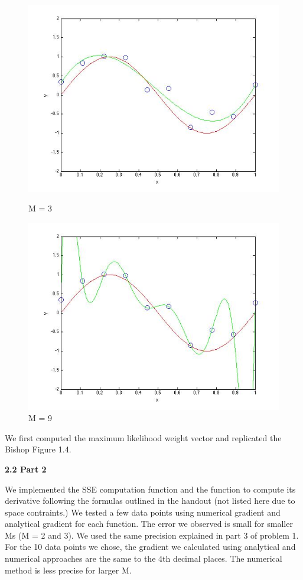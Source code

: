 \begin{figure}[!htb]
  \includegraphics[width=\linewidth]{figures/p2_MLE_M=3}
  \caption{M = 3}\label{fig:figures/p2_M=3}
\endminipage\hfill
{}                                                                            
  \includegraphics[width=\linewidth]{figures/p2_MLE_M=9}
  \caption{M = 9}\label{fig:figures/p2_M=9}
\endminipage\hfill
\end{figure}

We first computed the maximum likelihood weight vector and replicated 
the Bishop Figure 1.4.


{\bfseries 2.2 Part 2}

We implemented the SSE computation function and the function to compute its derivative following the formulas outlined in the handout (not listed here due to space contraints.)
We tested a few data points using numerical gradient and analytical gradient for each function.
The error we observed is small for smaller Ms (M = 2 and 3).  We used the same precision explained
 in part 3 of problem 1. For the 10 data points we chose, the gradient we calculated using analytical and numerical approaches are the same to the 4th decimal places. The numerical method is less precise for larger M. 

